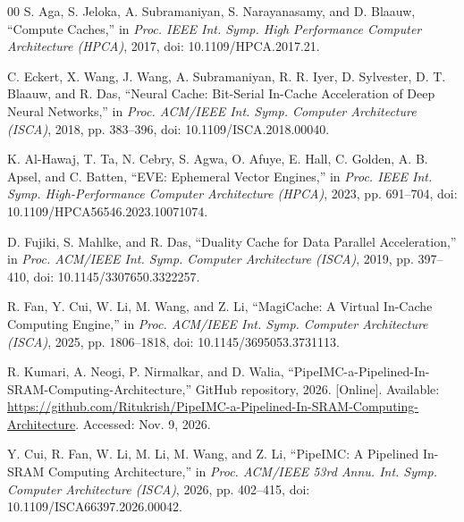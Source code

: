 \documentclass[conference]{IEEEtran}
\begin{document}
\balance
\begin{thebibliography}{00}
S. Aga, S. Jeloka, A. Subramaniyan, S. Narayanasamy, and D. Blaauw, ``Compute Caches,'' in \textit{Proc. IEEE Int. Symp. High Performance Computer Architecture (HPCA)}, 2017, doi: 10.1109/HPCA.2017.21.

C. Eckert, X. Wang, J. Wang, A. Subramaniyan, R. R. Iyer, D. Sylvester, D. T. Blaauw, and R. Das, ``Neural Cache: Bit-Serial In-Cache Acceleration of Deep Neural Networks,'' in \textit{Proc. ACM/IEEE Int. Symp. Computer Architecture (ISCA)}, 2018, pp. 383--396, doi: 10.1109/ISCA.2018.00040.

K. Al-Hawaj, T. Ta, N. Cebry, S. Agwa, O. Afuye, E. Hall, C. Golden, A. B. Apsel, and C. Batten, ``EVE: Ephemeral Vector Engines,'' in \textit{Proc. IEEE Int. Symp. High-Performance Computer Architecture (HPCA)}, 2023, pp. 691--704, doi: 10.1109/HPCA56546.2023.10071074.

D. Fujiki, S. Mahlke, and R. Das, ``Duality Cache for Data Parallel Acceleration,'' in \textit{Proc. ACM/IEEE Int. Symp. Computer Architecture (ISCA)}, 2019, pp. 397--410, doi: 10.1145/3307650.3322257.

R. Fan, Y. Cui, W. Li, M. Wang, and Z. Li, ``MagiCache: A Virtual In-Cache Computing Engine,'' in \textit{Proc. ACM/IEEE Int. Symp. Computer Architecture (ISCA)}, 2025, pp. 1806--1818, doi: 10.1145/3695053.3731113.

R. Kumari, A. Neogi, P. Nirmalkar, and D. Walia, ``PipeIMC-a-Pipelined-In-SRAM-Computing-Architecture,'' GitHub repository, 2026. [Online]. Available: \url{https://github.com/Ritukrish/PipeIMC-a-Pipelined-In-SRAM-Computing-Architecture}. Accessed: Nov. 9, 2026.

Y. Cui, R. Fan, W. Li, M. Li, M. Wang, and Z. Li, ``PipeIMC: A Pipelined In-SRAM Computing Architecture,'' in \textit{Proc. ACM/IEEE 53rd Annu. Int. Symp. Computer Architecture (ISCA)}, 2026, pp. 402--415, doi: 10.1109/ISCA66397.2026.00042.
\end{thebibliography}
\end{document}
